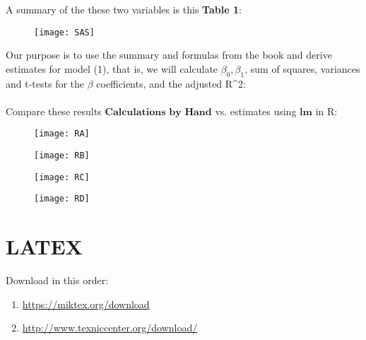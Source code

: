 \documentclass[letterpaper,11pt]{article}
\begin{document}
	A summary of the these two variables is this \textbf{Table 1}:
	
		\begin{figure}[htbp]
		\centering
			\texttt{[image: SAS]}
	\end{figure}
	
\newpage
	
	Our purpose is to use the summary and formulas from the book and derive estimates for model (1), that is, we will calculate $\beta_{0}, 		
	\beta_{1}$, sum of squares, variances and t-tests for the $\beta$ coefficients, and the adjusted R^2:
	\\ \\
	Compare these results $\textbf{Calculations by Hand}$ vs. estimates using $\textbf{lm}$ in R:

	\begin{figure}[htbp]
		\centering
			\texttt{[image: RA]}
	\end{figure}
	
	\begin{figure}[htbp]
		\centering
			\texttt{[image: RB]}
	\end{figure}
	
	\begin{figure}[htbp]
		\centering
			\texttt{[image: RC]}
	\end{figure}
		
	\begin{figure}[htbp]
		\centering
			\texttt{[image: RD]}
	\end{figure}
			
\newpage

\section{LATEX}

Download in this order:

\begin{enumerate}
	\item \url{https://miktex.org/download}
	\item \url{http://www.texniccenter.org/download/}
\end{enumerate}

\end{document}
